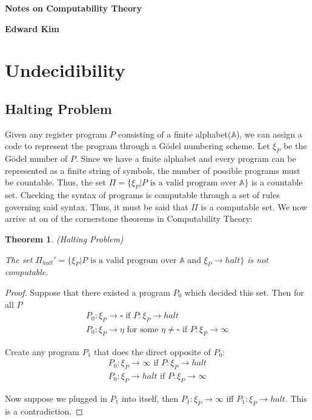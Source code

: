 \documentclass[a4paper,10pt]{article}
\newtheorem{theorem}{Theorem}[section]
\newcommand*\map{\rightarrow}
\newcommand*\n{\newline\par}
\begin{document}
\begin{titlepage}
   \centering
    {\huge\bfseries Notes on Computability Theory\par}
    \space
    {\huge\bfseries Edward Kim\par}
\end{titlepage}

\newpage
\tableofcontents

\newpage
\section{Undecidibility}

\subsection{Halting Problem}
Given any register program $P$ consisting of a finite alphabet($\mathbb{A}$), we can assign a code to represent the program through a G\"{o}del numbering scheme. Let $\xi_P$ be the G\"{o}del number of $P$.
Since we have a finite alphabet and every program can be represented as a finite string of symbols, the number of possible programs must be countable. Thus, the set 
$\Pi = \{\xi_P \vert \text{$P$ is a valid program over $\mathbb{A}$}\}$ is a countable set. Checking the syntax of programs is computable through a set of rules governing said syntax. Thus, it must be said that
$\Pi$ is a computable set. We now arrive at on of the cornerstone theorems in Computability Theory:

\begin{theorem}
 (Halting Problem) \n
 The set $\Pi_{halt}' = \{\xi_P \vert \text{$P$ is a valid program over $\mathbb{A}$ and $\xi_P \map halt$}\}$ is not computable.
\end{theorem}

\begin{proof}
 Suppose that there existed a program $P_0$ which decided this set.  Then for all $P$
 \begin{gather*}
  P_0: \xi_P \map\square \text{ if } P: \xi_P \map halt \\
  P_0: \xi_P  \map \eta \text{ for some $\eta \neq \square $ if } P: \xi_P \map \infty
 \end{gather*}

 Create any program $P_1$ that does the direct opposite of $P_0$:
 \begin{gather*}
  P_0: \xi_P \map\infty \text{ if } P: \xi_P \map halt \\
  P_0: \xi_P  \map halt \text{ if } P: \xi_P \map \infty
 \end{gather*}
 
 Now suppose we plugged in $P_1$ into itself, then 
 $P_1:\xi_P \map\infty $ iff $P_1:\xi_P \map halt$. This is a contradiction.
 
\end{proof}
\end{document}
